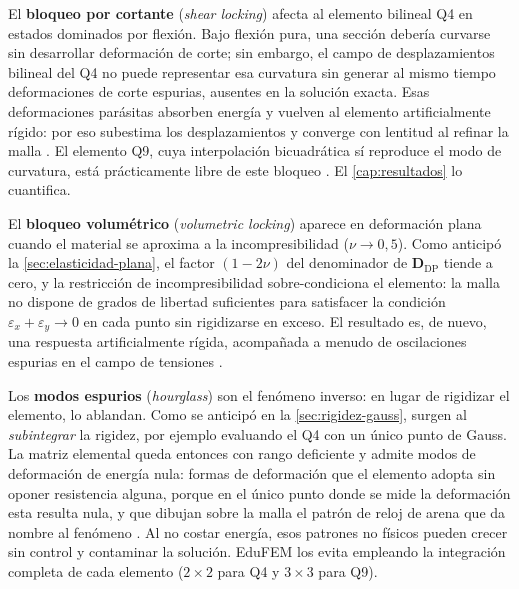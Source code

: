 El \textbf{bloqueo por cortante} (\emph{shear locking}) afecta al elemento bilineal Q4 en estados dominados por flexión. Bajo flexión pura, una sección debería curvarse sin desarrollar deformación de corte; sin embargo, el campo de desplazamientos bilineal del Q4 no puede representar esa curvatura sin generar al mismo tiempo deformaciones de corte espurias, ausentes en la solución exacta. Esas deformaciones parásitas absorben energía y vuelven al elemento artificialmente rígido: por eso subestima los desplazamientos y converge con lentitud al refinar la malla \autocites[pp.~98-99]{cook2002concepts}[p.~243]{hughes2000fem}. El elemento Q9, cuya interpolación bicuadrática sí reproduce el modo de curvatura, está prácticamente libre de este bloqueo \autocites[pp.~235-236]{cook2002concepts}[p.~243]{hughes2000fem}. El \autoref{cap:resultados} lo cuantifica.

El \textbf{bloqueo volumétrico} (\emph{volumetric locking}) aparece en deformación plana cuando el material se aproxima a la incompresibilidad ($\nu \to 0{,}5$). Como anticipó la \autoref{sec:elasticidad-plana}, el factor $(1-2\nu)$ del denominador de $\bm{D}_{\text{DP}}$ tiende a cero, y la restricción de incompresibilidad sobre-condiciona el elemento: la malla no dispone de grados de libertad suficientes para satisfacer la condición $\varepsilon_x + \varepsilon_y \to 0$ en cada punto sin rigidizarse en exceso. El resultado es, de nuevo, una respuesta artificialmente rígida, acompañada a menudo de oscilaciones espurias en el campo de tensiones \autocites[pp.~192, 208]{hughes2000fem}[pp.~282-283]{bathe2014fem}.

Los \textbf{modos espurios} (\emph{hourglass}) son el fenómeno inverso: en lugar de rigidizar el elemento, lo ablandan. Como se anticipó en la \autoref{sec:rigidez-gauss}, surgen al \emph{subintegrar} la rigidez, por ejemplo evaluando el Q4 con un único punto de Gauss. La matriz elemental queda entonces con rango deficiente y admite modos de deformación de energía nula: formas de deformación que el elemento adopta sin oponer resistencia alguna, porque en el único punto donde se mide la deformación esta resulta nula, y que dibujan sobre la malla el patrón de reloj de arena que da nombre al fenómeno \autocites[p.~223]{cook2002concepts}[pp.~472-473]{bathe2014fem}. Al no costar energía, esos patrones no físicos pueden crecer sin control y contaminar la solución. EduFEM los evita empleando la integración completa de cada elemento ($2\times2$ para Q4 y $3\times3$ para Q9).

